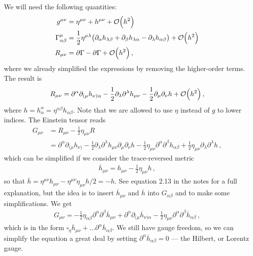 \documentclass[main.tex]{subfiles}
\begin{document}
We will need the following quantities: 
%
\begin{align}
g^{\mu \nu } &= \eta^{\mu \nu } + h^{\mu \nu } + \order{h^2}  \\
\Gamma^{\mu }_{\alpha \beta } &= \frac{1}{2} \eta^{\mu \lambda } \qty(\partial_{\alpha } h_{\lambda \beta } + \partial_{\beta } h_{\lambda \alpha } - \partial_{\lambda } h_{\alpha \beta } ) + \order{h^2}  \\
R_{\mu \nu } &= \partial \Gamma - \partial \Gamma + \order{h^2}
\,,
\end{align}
%
where we already simplified the expressions by removing the higher-order terms. The result is 
%
\begin{align}
R_{\mu \nu } = \partial^{\alpha } \partial_{(\mu } h_{\nu ) \alpha } 
- \frac{1}{2} \partial_{\lambda } \partial^{\lambda } h_{\mu  \nu } - \frac{1}{2} \partial_{\mu } \partial_{\nu } h + \order{h^2} 
\,,
\end{align}
%
where \(h = h^{\alpha }_{\alpha } = \eta^{\alpha \beta } h_{\alpha \beta }\). Note that we are allowed to use \(\eta \) instead of \(g\) to lower indices. The Einstein tensor reads  
%
\begin{align}
G_{\mu \nu } &= R_{\mu \nu } - \frac{1}{2}  \eta_{\mu \nu } R  \\
&= \partial^{\alpha } \partial_{(\mu } h_{\nu )} - \frac{1}{2} \partial_{\lambda } \partial^{\lambda } h_{\mu \nu } \partial_{\mu } \partial_{\nu } h - \frac{1}{2} \eta_{\mu \nu } \partial^{\alpha } \partial^{\beta } h_{\alpha \beta } + \frac{1}{2} \eta_{\mu \nu } \partial_{\lambda } \partial^{\lambda } h 
\,,
\end{align}
%
which can be simplified if we consider the trace-reversed metric 
%
\begin{align}
\overline{h}_{\mu \nu } = h_{\mu \nu} - \frac{1}{2} \eta_{\mu \nu } h
\,,
\end{align}
%
so that \(\overline{h} = \eta^{\mu \nu }h_{\mu \nu } - \eta^{\mu \nu } \eta_{\mu \nu } h / 2 = - h\). 
See equation 2.13 in the notes for a full explanation, but the idea is to insert \(\overline{h}_{\mu \nu } \) and \(\overline{h}\) into \(G_{\alpha \beta }\) and to make some simplifications. We get 
%
\begin{align}
G_{\mu \nu } = - \frac{1}{2} \eta_{\alpha \beta } \partial^{\alpha } \partial^{\beta } \overline{h}_{\mu \nu } + \partial^{\alpha } \partial_{(\mu } \overline{h}_{\nu ) \alpha } - \frac{1}{2} \eta_{\mu \nu } \partial^{\alpha } \partial^{\beta } \overline{h}_{\alpha \beta }
\,,
\end{align}
%
which is in the form \(\square_{\eta } \overline{h}_{\mu \nu } + \dots \partial^{\alpha } \overline{h}_{\alpha \beta }\). We still have gauge freedom, so we can simplify the equation a great deal by setting \(\partial^{\alpha } \overline{h}_{\alpha \beta } = 0\) --- the Hilbert, or Lorentz gauge.
\end{document}
